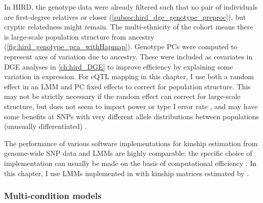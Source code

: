 In \gls{HIRD},
the genotype data were already filtered such that no pair of individuals are first-degree relatives or closer (\cref{subsec:hird_dge_genotype_preproc}),
but cryptic relatedness might remain.
The multi-ethnicity of the cohort means there is large-scale population structure from ancestry (\cref{fig:hird_genotype_pca_withHapmap}).
Genotype \glspl{PC} were computed to represent axes of variation due to ancestry.
These were included as covariates in \gls{DGE} analyses in \cref{ch:hird_DGE} to improve efficiency by explaining some variation in expression.
For \gls{eQTL} mapping in this chapter, I use both a random effect in an \gls{LMM} and \gls{PC} fixed effects to correct for population structure.
This may not be strictly necessary if the random effect can correct for large-scale structure, 
but does not seem to impact power or type I error rate \autocite{widmer2015FurtherImprovementsLinear},
and may have some benefits at \glspl{SNP} with very different allele distributions between populations (unusually differentiated) \autocite{price2010NewApproachesPopulation}.

The performance of various software implementations 
for kinship estimation from genome-wide \gls{SNP} data and \glspl{LMM} are highly comparable; 
the specific choice of implementation can usually be made on the basis of computational efficiency \autocite{eu-ahsunthornwattana2014ComparisonMethodsAccount}.
In this chapter, I use
\glspl{LMM} implemented in  \autocite{lippert2014LIMIXGeneticAnalysis}
with kinship matrices estimated by  \autocite{speed2012ImprovedHeritabilityEstimation}.

\subsubsection{Multi-condition models}

